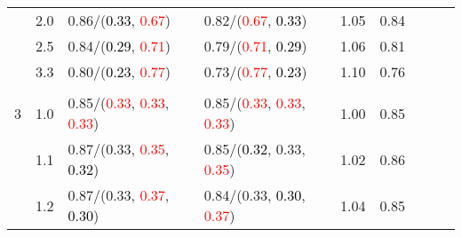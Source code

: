 \documentclass[10pt,a4paper]{report}
\begin{document}
\begin{table}[!htbp]
\begin{center}
{\begin{tabular}{ccllccccc}
				  & 2.0                               & 0.86/(\textcolor{black}{0.33}, \textcolor{red}{0.67})                                                                                           & 0.82/(\textcolor{red}{0.67}, \textcolor{black}{0.33})                                                                                           & 1.05             & 0.84                     \\
				  & 2.5                               & 0.84/(\textcolor{black}{0.29}, \textcolor{red}{0.71})                                                                                           & 0.79/(\textcolor{red}{0.71}, \textcolor{black}{0.29})                                                                                           & 1.06             & 0.81                     \\
				  & 3.3                               & 0.80/(\textcolor{black}{0.23}, \textcolor{red}{0.77})                                                                                           & 0.73/(\textcolor{red}{0.77}, \textcolor{black}{0.23})                                                                                           & 1.10             & 0.76                     \\
				  &                                   &                                                                                                                                                 &                                                                                                                                                 &                                             \\
				3 & 1.0                               & 0.85/(\textcolor{red}{0.33}, \textcolor{red}{0.33}, \textcolor{red}{0.33})                                                                      & 0.85/(\textcolor{red}{0.33}, \textcolor{red}{0.33}, \textcolor{red}{0.33})                                                                      & 1.00             & 0.85                     \\
				  & 1.1                               & 0.87/(0.33, \textcolor{red}{0.35}, \textcolor{black}{0.32})                                                                                     & 0.85/(\textcolor{black}{0.32}, 0.33, \textcolor{red}{0.35})                                                                                     & 1.02             & 0.86                     \\
				  & 1.2                               & 0.87/(0.33, \textcolor{red}{0.37}, \textcolor{black}{0.30})                                                                                     & 0.84/(0.33, \textcolor{black}{0.30}, \textcolor{red}{0.37})                                                                                     & 1.04             & 0.85                     \\

\end{tabular}}
\end{center}
\end{table}
\end{document}
